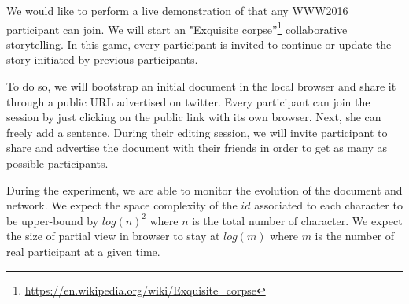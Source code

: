 We would like to perform a live demonstration of \CRATE that any
WWW2016 participant can join. We will start an "Exquisite
corpse''\footnote{\url{https://en.wikipedia.org/wiki/Exquisite_corpse}}
collaborative storytelling. In this game, every participant is invited
to continue or update the story initiated by previous participants.

To do so, we will bootstrap an initial document in the local browser
and share it through a public URL advertised on twitter. Every
participant can join the session by just clicking on the public link
with its own browser. Next, she can freely add a sentence. During
their editing session, we will invite participant to share and
advertise the document with their friends in order to get as many as
possible participants.

During the experiment, we are able to monitor the evolution of the
document and network. We expect the space complexity of the $id$
associated to each character to be upper-bound by $log(n)^2$ where $n$
is the total number of character. We expect the size of partial view
in browser to stay at $log(m)$ where $m$ is the number of real
participant at a given time.
 


